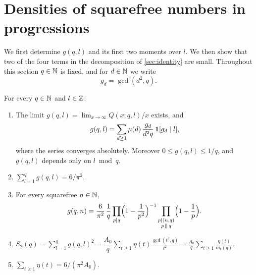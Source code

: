 \section{Densities of squarefree numbers in progressions}\label{sec:densities}

We first determine $g(q,l)$ and its first two moments over $l$. We then show that two of the four terms in the decomposition of \cref{sec:identity} are small. Throughout this section $q\in\mathbb{N}$ is fixed, and for $d\in\mathbb{N}$ we write
\[
g_d=\gcd(d^2,q).
\]

\begin{proposition}\label{prop:densities}
For every $q\in\mathbb{N}$ and $l\in\mathbb{Z}$:
\begin{enumerate}[label=\textup{(\roman*)}]
\item The limit $g(q,l)=\lim_{x\to\infty}Q(x;q,l)/x$ exists, and
\begin{equation}\label{eq:g-series}
g(q,l)=\sum_{d\ge1}\mu(d)\,\frac{g_d}{d^2q}\,\mathbf{1}[g_d\mid l],
\end{equation}
where the series converges absolutely. Moreover $0\le g(q,l)\le1/q$, and $g(q,l)$ depends only on $l\bmod q$.
\item $\sum_{l=1}^qg(q,l)=6/\pi^2$.
\item For every squarefree $n\in\mathbb{N}$,
\[
g(q,n)=\frac{6}{\pi^2}\,\frac1q\prod_{p\mid q}\Bigl(1-\frac1{p^2}\Bigr)^{-1}\prod_{\substack{p\mid(n,q)\\ p\,\|\,q}}\Bigl(1-\frac1p\Bigr).
\]
\item $S_2(q)=\sum_{l=1}^qg(q,l)^2=\dfrac{A_0}{q}\displaystyle\sum_{t\ge1}\eta(t)\frac{\gcd(t^2,q)}{t^2}=\frac{A_0}{q}\sum_{t\ge1}\frac{\eta(t)}{m_t(q)}$.
\item $\sum_{t\ge1}\eta(t)=6/(\pi^2A_0)$.
\end{enumerate}
\end{proposition}

